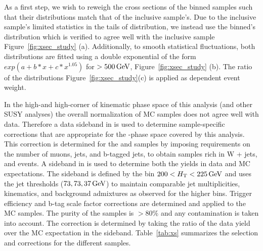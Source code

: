 
As a first step, we wish to reweigh the cross sections of the \partonht binned samples such that
their \partonht distributions match that of the inclusive sample's. Due to
the inclusive sample's limited statistics in the tails of \scalht distribution, 
we instead use the \nparton binned's \partonht distribution which is verified to agree well 
with the inclusive sample Figure~\ref{fig:xsec_study} (a).  Additionally, to smooth statistical
fluctuations, both distributions are fitted using a double exponential of the form $exp(a+b*x + c*x^{1.05})$
for \scalht $> 500\,\text{Ge\hspace{-.08em}V}$, Figure~\ref{fig:xsec_study} (b). The ratio of the distributions Figure~\ref{fig:xsec_study}(c) 
is applied as \partonht dependent event weight.

In the high-\scalht and high-\met corner of kinematic phase space of this analysis 
(and other SUSY analyses) the overall normalization of MC samples does not 
agree well with data. Therefore a data sideband in \scalht is used
to determine sample-specific corrections that are appropriate for the
\scalht-\met phase space covered by this analysis. This correction is determined 
for the \wlnu and \ttbar samples by imposing requirements on the number of muons, 
jets, and b-tagged jets, to obtain samples rich in W + jets, and \ttbar events.
A sideband in \scalht is used to determine both the yields in data and
MC expectations. The sideband is defined by the bin $200 < \mbox{$H_\text{T}$}
< 225\,\text{Ge\hspace{-.08em}V}$ and uses the jet \pt thresholds ($73,73,37\,\text{Ge\hspace{-.08em}V}$) to maintain 
comparable jet multiplicities, kinematics, and background admixtures as observed for the
higher \scalht bins. Trigger efficiency and b-tag scale factor corrections 
are determined and applied to the MC samples. The purity of the samples is $>80\%$ and
any contamination is taken into account. The correction is determined by 
taking the ratio of the data yield over the MC expectation in the sideband. 
Table~\ref{tab:xs} summarizes the selection and corrections for the different samples. 

